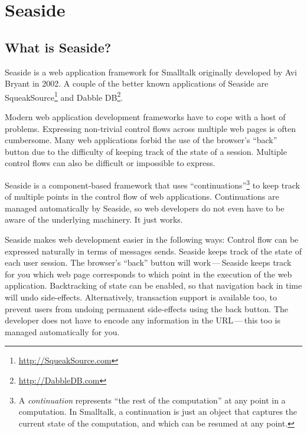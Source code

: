 \documentclass[a4paper,10pt,twoside]{book}
\begin{document}
	\sloppy
\fi
\chapter{Seaside}
\label{cha:seaside}


\section{What is Seaside?}

Seaside is a web application framework for Smalltalk originally developed by Avi Bryant in 2002.
A couple of the better known applications of Seaside are SqueakSource\footnote{\url{http://SqueakSource.com}} and Dabble DB\footnote{\url{http://DabbleDB.com}}.

Modern web application development frameworks have to cope with a host of problems. Expressing non-trivial control flows across multiple web pages is often cumbersome. Many web applications forbid the use of the browser's ``back'' button due to the difficulty of keeping track of the state of a session. Multiple control flows can also be difficult or impossible to express.

Seaside is a component-based framework that uses ``continuations''\footnote{A \emph{continuation} represents ``the rest of the computation'' at any point in a computation. In Smalltalk, a continuation is just an object that captures the current state of the computation, and which can be resumed at any point.} to keep track of multiple points in the control flow of web applications. Continuations are managed automatically by Seaside, so web developers do not even have to be aware of the underlying machinery. It just works.

Seaside makes web development easier in the following ways:
Control flow can be expressed naturally in terms of messages sends.
Seaside keeps track of the state of each user session.
The browser's ``back'' button will work\,---\,Seaside keeps track for you which web page corresponds to which point in the execution of the web application.
Backtracking of state can be enabled, so that navigation back in time will undo side-effects.
Alternatively, transaction support is available too, to prevent users from undoing permanent side-effects using the back button.
The developer does not have to encode any information in the URL\,---\,this too is managed automatically for you.
\end{document}
